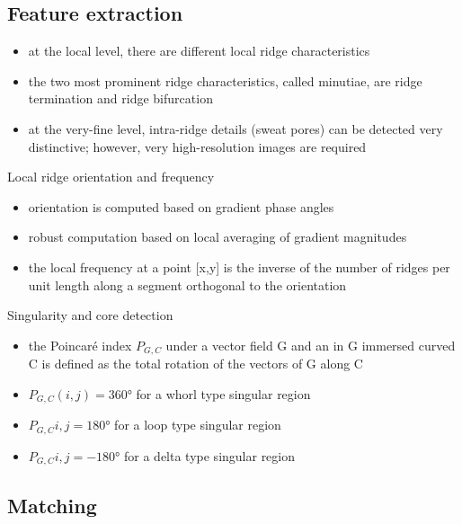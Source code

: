 \documentclass[paper=a4, fontsize=11pt]{scrartcl} %
\numberwithin{equation}{section} %
\numberwithin{figure}{section} %
\numberwithin{table}{section} %
\begin{document}
\subsection{Feature extraction}

\begin{itemize}
\item at the local level, there are different local ridge characteristics
\item the two most prominent ridge characteristics, called minutiae, are ridge termination and ridge bifurcation
\item at the very-fine level, intra-ridge details (sweat pores) can be detected very distinctive; however, very high-resolution images are required
\end{itemize}

Local ridge orientation and frequency
\begin{itemize}
\item orientation is computed based on gradient phase angles
\item robust computation based on local averaging of gradient magnitudes
\item the local frequency at a point [x,y] is the inverse of the number of ridges per unit length along a segment orthogonal to the orientation
\end{itemize}

Singularity and core detection
\begin{itemize}
\item the Poincaré index $P_{G,C}$ under a vector field G and an in G immersed curved C is defined as the total rotation of the vectors of G along C
\item $P_{G,C}(i,j) = 360°$ for a whorl type singular region
\item $P_{G,C}{i,j} = 180°$ for a loop type singular region
\item $P_{G,C}{i,j} = -180°$ for a delta type singular region
\end{itemize}

\subsection{Matching}
\end{document}
